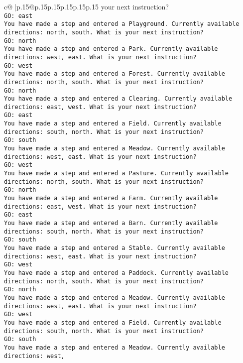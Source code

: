 \documentclass{article}
\begin{document}
{\begin{supertabular}{c@{$\;$}|p{.15\linewidth}@{}p{.15\linewidth}p{.15\linewidth}p{.15\linewidth}p{.15\linewidth}p{.15\linewidth}}
{{{your next instruction?\\ \tt GO: east\\ \tt You have made a step and entered a Playground. Currently available directions: north, south. What is your next instruction?\\ \tt GO: north\\ \tt You have made a step and entered a Park. Currently available directions: west, east. What is your next instruction?\\ \tt GO: west\\ \tt You have made a step and entered a Forest. Currently available directions: north, south. What is your next instruction?\\ \tt GO: north\\ \tt You have made a step and entered a Clearing. Currently available directions: east, west. What is your next instruction?\\ \tt GO: east\\ \tt You have made a step and entered a Field. Currently available directions: south, north. What is your next instruction?\\ \tt GO: south\\ \tt You have made a step and entered a Meadow. Currently available directions: west, east. What is your next instruction?\\ \tt GO: west\\ \tt You have made a step and entered a Pasture. Currently available directions: north, south. What is your next instruction?\\ \tt GO: north\\ \tt You have made a step and entered a Farm. Currently available directions: east, west. What is your next instruction?\\ \tt GO: east\\ \tt You have made a step and entered a Barn. Currently available directions: south, north. What is your next instruction?\\ \tt GO: south\\ \tt You have made a step and entered a Stable. Currently available directions: west, east. What is your next instruction?\\ \tt GO: west\\ \tt You have made a step and entered a Paddock. Currently available directions: north, south. What is your next instruction?\\ \tt GO: north\\ \tt You have made a step and entered a Meadow. Currently available directions: west, east. What is your next instruction?\\ \tt GO: west\\ \tt You have made a step and entered a Field. Currently available directions: south, north. What is your next instruction?\\ \tt GO: south\\ \tt You have made a step and entered a Meadow. Currently available directions: west, }}}
\end{supertabular}}
\end{document}
